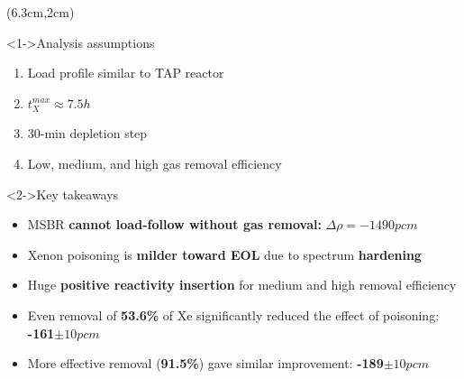 \begin{frame}
\begin{columns}
	\column[t]{5.5cm}
	\begin{textblock*}{6.1cm}(6.3cm,2cm) %
	\begin{block}<1->{Analysis assumptions}
				\fontsize{7}{9}\selectfont
		\begin{enumerate}             
			\item Load profile similar to TAP reactor
			\item $t^{max}_X\approx7.5h$
			\item 30-min depletion step
			\item Low, medium, and high gas removal efficiency
		\end{enumerate}
		\vspace{-1mm}
	\end{block}

	\begin{block}<2->{Key takeaways}
				\fontsize{7}{9}\selectfont
		\begin{itemize}
			\item MSBR \textbf{cannot load-follow without gas removal:} 
			$\Delta\rho=-1490pcm$
			\item Xenon poisoning is \textbf{milder toward EOL} due to 
			spectrum \textbf{hardening}
			\item Huge \textbf{positive reactivity insertion} for medium 
			and high removal efficiency
			\item Even removal of \textbf{53.6\%} of Xe significantly 
			reduced the effect of poisoning: \textbf{-161$\pm10pcm$}
			\item More effective removal (\textbf{91.5\%}) gave similar 
			improvement: \textbf{-189$\pm10pcm$}
		\end{itemize}
		
	\end{block}
\end{textblock*}
\end{columns}
\end{frame}

